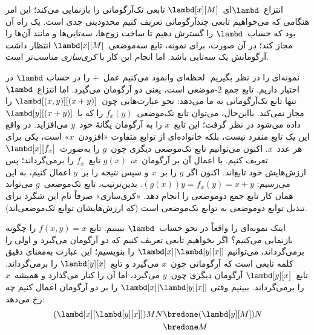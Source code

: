 \documentclass[../../../include/open-logic-section]{subfiles}
\begin{document}

انتزاع~$\lambd$ای~$\lambd[x][M]$ تابعی تک‌آرگومانی را بازنمایی می‌کند؛
این امر هنگامی که می‌خواهیم تابعی چندآرگومانی تعریف کنیم محدودیتی جدی
است. یک راه آن بود که حساب~$\lambd$ را گسترش دهیم تا ساخت زوج‌ها،
سه‌تایی‌ها و مانند آن‌ها را مجاز کند؛ در آن صورت، برای نمونه، تابع
سه‌موضعی~$\lambd[x][M]$ انتظار داشت آرگومانش یک سه‌تایی باشد. اما انجام
این کار با \emph{کری‌سازی} مناسب‌تر است.

نمونه‌ای را در نظر بگیریم. لحظه‌ای وانمود می‌کنیم عمل~$+$ را در حساب
$\lambd$ در اختیار داریم. تابع جمع $2$-موضعی است، یعنی دو آرگومان
می‌گیرد. اما انتزاع~$\lambd$ تنها تابع تک‌آرگومانی به ما می‌دهد: نحو
عبارت‌هایی چون~$\lambd[(x,y)][(x+y)]$ را مجاز نمی‌کند. بااین‌حال، می‌توان
تابع تک‌موضعی~$f_x(y)$ را که با~$\lambd[y][(x+y)]$ داده می‌شود در نظر
گرفت؛ این تابع~$x$ را به آرگومان یگانهٔ خود~$y$ می‌افزاید. در واقع این
یک تابع منفرد نیست، بلکه خانواده‌ای از توابع متفاوت «افزودن~$x$» است،
یکی برای هر عدد~$x$. اکنون می‌توانیم تابع تک‌موضعی دیگری چون~$g$ را
به‌صورت~$\lambd[x][f_x]$ تعریف کنیم. با اعمال آن بر آرگومان~$x$،
$g(x)$ تابع~$f_x$ را برمی‌گرداند؛ پس ارزش‌هایش خود تابع‌اند. اکنون اگر
$g$ را بر~$x$ و سپس نتیجه را بر~$y$ اعمال کنیم، به این می‌رسیم:
$(g(x))y = f_x(y) = x+y$. بدین‌ترتیب، تابع تک‌موضعی~$g$ می‌تواند همان
کار تابع جمع دو‌موضعی را انجام دهد. «کری‌سازی» صرفاً نام این شگرد برای
تبدیل توابع دو‌موضعی به توابع تک‌موضعی است (که ارزش‌هایشان توابع
تک‌موضعی‌اند).

اینک نمونه‌ای را واقعاً در نحو حساب~$\lambd$ ببینیم. تابع
$f(x,y) = x$ را چگونه بازنمایی می‌کنیم؟ اگر بخواهیم تابعی تعریف کنیم که
دو آرگومان می‌گیرد و اولی را برمی‌گرداند، می‌توانیم
$\lambd[x][\lambd[y][x]]$ را بنویسیم؛ این عبارت به‌معنای دقیق کلمه تابعی
است که آرگومانی چون~$x$ می‌گیرد و تابع~$\lambd[y][x]$ را برمی‌گرداند.
تابع~$\lambd[y][x]$ آرگومان دیگری چون~$y$ می‌گیرد، اما آن را کنار
می‌گذارد و همیشه~$x$ را برمی‌گرداند. ببینیم وقتی
$\lambd[x][\lambd[y][x]]$ را بر دو آرگومان اعمال کنیم چه رخ می‌دهد:
\begin{align*}
  (\lambd[x][\lambd[y][x]])MN
  \bredone & (\lambd[y][M])N \\
  \bredone & M
\end{align*}
\end{document}
